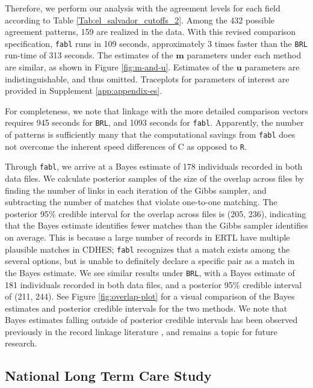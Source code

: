 \documentclass[ba]{imsart}
\begin{document}
	Therefore, we perform our analysis with the agreement levels for each field according to Table \ref{Tab:el_salvador_cutoffs_2}. Among the 432 possible agreement patterns, 159 are realized in the data. With this revised comparison specification, \texttt{fabl} runs in 109 seconds, approximately 3 times faster than the \texttt{BRL} run-time of 313 seconds.  The estimates of the $\bm{m}$ parameters under each method are similar, as shown in Figure \ref{fig:m-and-u}. Estimates of the $\bm{u}$ parameters are indistinguishable, and thus omitted. Traceplots for parameters of interest are provided in Supplement \ref{app:appendix-es}.
	
	For completeness, we note that linkage with the more detailed comparison vectors requires 945 seconds for \texttt{BRL}, and 1093 seconds for \texttt{fabl}.  Apparently, the number of patterns is sufficiently many that the computational savings from \texttt{fabl} does not overcome the inherent speed differences of C as opposed to \texttt{R}.
	
	Through \texttt{fabl}, we arrive at a Bayes estimate of 178 individuals recorded in both data files. We calculate posterior samples of the size of the overlap across files by finding the number of links in each iteration of the Gibbs sampler, and subtracting the number of matches that violate one-to-one matching. The posterior 95\% credible interval for the overlap across files is (205, 236), indicating that the Bayes estimate identifies fewer matches than the Gibbs sampler identifies on average. This is because a large number of records in ERTL have multiple plausible matches in CDHES; \texttt{fabl} recognizes that a match exists among the several options, but is unable to definitely declare a specific pair as a match in the Bayes estimate. We see similar results under \texttt{BRL}, with a Bayes estimate of 181 individuals recorded in both data files, and a posterior 95\% credible interval of (211, 244). See Figure \ref{fig:overlap-plot} for a visual comparison of the Bayes estimates and posterior credible intervals for the two methods. We note that Bayes estimates falling outside of posterior credible intervals has been observed previously in the record linkage literature \citep{sadinle_bayesian_2017, steorts_bayesian_2016}, and remains a topic for future research.
	

	

	
	\subsection{National Long Term Care Study}
	\label{nltcs}
	
\end{document}
